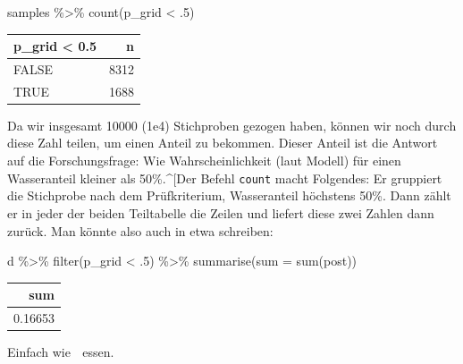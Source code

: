 \documentclass[
  a4paper,
  DIV=11]{scrreprt}
\newenvironment{Shaded}{\begin{snugshade}}{\end{snugshade}}
\newcommand{\AttributeTok}[1]{\textcolor[rgb]{0.40,0.45,0.13}{#1}}
\newcommand{\DecValTok}[1]{\textcolor[rgb]{0.68,0.00,0.00}{#1}}
\newcommand{\FunctionTok}[1]{\textcolor[rgb]{0.28,0.35,0.67}{#1}}
\newcommand{\NormalTok}[1]{\textcolor[rgb]{0.00,0.23,0.31}{#1}}
\newcommand{\SpecialCharTok}[1]{\textcolor[rgb]{0.37,0.37,0.37}{#1}}
\theoremstyle{definition}
\theoremstyle{remark}
\begin{document}
\begin{Shaded}
\begin{Highlighting}[]
\NormalTok{samples }\SpecialCharTok{\%\textgreater{}\%}
  \FunctionTok{count}\NormalTok{(p\_grid }\SpecialCharTok{\textless{}}\NormalTok{ .}\DecValTok{5}\NormalTok{) }
\end{Highlighting}
\end{Shaded}

\begin{longtable}[]{@{}lr@{}}
\toprule()
p\_grid \textless{} 0.5 & n \\
\midrule()
\endhead
FALSE & 8312 \\
TRUE & 1688 \\
\bottomrule()
\end{longtable}

Da wir insgesamt 10000 (1e4) Stichproben gezogen haben, können wir noch
durch diese Zahl teilen, um einen Anteil zu bekommen. Dieser Anteil ist
die Antwort auf die Forschungsfrage: Wie Wahrscheinlichkeit (laut
Modell) für einen Wasseranteil kleiner als 50\%.\^{}{[}Der Befehl
\texttt{count} macht Folgendes: Er gruppiert die Stichprobe nach dem
Prüfkriterium, Wasseranteil höchstens 50\%. Dann zählt er in jeder der
beiden Teiltabelle die Zeilen und liefert diese zwei Zahlen dann zurück.
Man könnte also auch in etwa schreiben:

\begin{Shaded}
\begin{Highlighting}[]
\NormalTok{d }\SpecialCharTok{\%\textgreater{}\%}
  \FunctionTok{filter}\NormalTok{(p\_grid }\SpecialCharTok{\textless{}}\NormalTok{ .}\DecValTok{5}\NormalTok{) }\SpecialCharTok{\%\textgreater{}\%}
  \FunctionTok{summarise}\NormalTok{(}\AttributeTok{sum =} \FunctionTok{sum}\NormalTok{(post))}
\end{Highlighting}
\end{Shaded}

\begin{longtable}[]{@{}r@{}}
\toprule()
sum \\
\midrule()
\endhead
0.16653 \\
\bottomrule()
\end{longtable}

Einfach wie 🍰 essen.
\end{document}
